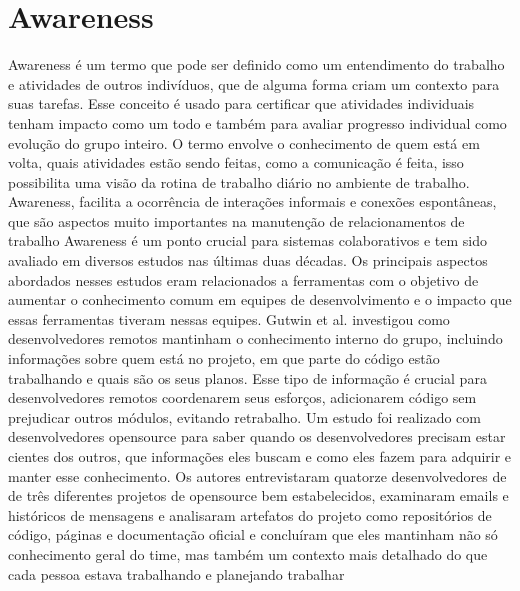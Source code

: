 \section{Awareness} 
Awareness é um termo que pode ser definido como um entendimento do trabalho e atividades de outros indivíduos, que de alguma forma criam um contexto para suas tarefas. Esse conceito é usado para certificar que atividades individuais tenham impacto como um todo e também para avaliar progresso individual como evolução do grupo inteiro. O termo envolve o conhecimento de quem está em volta, quais atividades estão sendo feitas, como a comunicação é feita, isso possibilita uma visão da rotina de trabalho diário no ambiente de trabalho. Awareness, facilita a ocorrência de interações informais e conexões espontâneas, que são aspectos muito importantes na manutenção de relacionamentos de trabalho
	Awareness é um ponto crucial para sistemas colaborativos e tem sido avaliado em diversos estudos nas últimas duas décadas. Os principais aspectos abordados nesses estudos eram relacionados a ferramentas com o objetivo de aumentar o conhecimento comum em equipes de desenvolvimento e o impacto que essas ferramentas tiveram nessas equipes. 
    Gutwin et al. investigou como desenvolvedores remotos mantinham o conhecimento interno do grupo, incluindo informações sobre quem está no projeto, em que parte do código estão trabalhando e quais são os seus planos. Esse tipo de informação é crucial para desenvolvedores remotos coordenarem seus esforços, adicionarem código sem prejudicar outros módulos, evitando retrabalho. Um estudo foi realizado com desenvolvedores opensource para saber quando os desenvolvedores precisam estar cientes dos outros, que informações eles buscam e como eles fazem para adquirir e manter esse conhecimento. Os autores entrevistaram quatorze desenvolvedores de de três diferentes projetos de opensource bem estabelecidos, examinaram emails e históricos de mensagens e analisaram artefatos do projeto como repositórios de código, páginas e documentação oficial e concluíram que eles mantinham não só conhecimento geral do time, mas também um contexto mais detalhado do que cada pessoa estava trabalhando e planejando trabalhar
